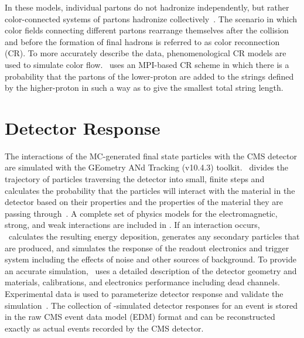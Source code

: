 \begin{refsection}
In these models, individual partons do not hadronize independently, but rather color-connected systems of partons hadronize collectively~\cite{BUCKLEY2011145}.
The scenario in which color fields connecting different partons rearrange themselves after the collision and before the formation of final hadrons is referred to as color reconnection (CR).
To more accurately describe the data, phenomenological CR models are used to simulate color flow.
\Pythia\ uses an MPI-based CR scheme in which there is a probability that the partons of the lower-\pT proton are added to the strings defined by the higher-\pT proton in such a way as to give the smallest total string length.

\section{Detector Response}
The interactions of the MC-generated final state particles with the CMS detector are simulated with the GEometry ANd Tracking (\Geant v10.4.3) toolkit.
\Geant\ divides the trajectory of particles traversing the detector into small, finite steps and calculates the probability that the particles will interact with the material in the detector based on their properties and the properties of the material they are passing through~\cite{AGOSTINELLI2003250}.
A complete set of physics models for the electromagnetic, strong, and weak interactions are included in \Geant.
If an interaction occurs, \Geant\ calculates the resulting energy deposition, generates any secondary particles that are produced, and simulates the response of the readout electronics and trigger system including the effects of noise and other sources of background.
To provide an accurate simulation, \Geant\ uses a detailed description of the detector geometry and materials, calibrations, and electronics performance including dead channels.
Experimental data is used to parameterize detector response and validate the simulation~\cite{Bayatian:922757}.
The collection of \Geant-simulated detector responses for an event is stored in the raw CMS event data model (EDM) format and can be reconstructed exactly as actual events recorded by the CMS detector.




\clearpage
\printbibliography[heading=subbibliography,resetnumbers=true]
\end{refsection}